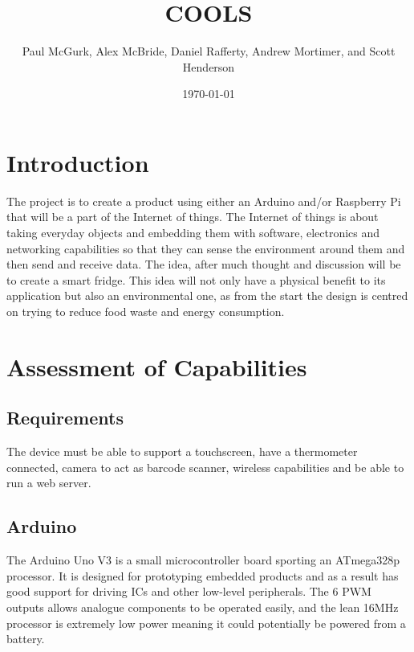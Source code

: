 \documentclass[10pt]{article}
\title{COOLS}
\author{Paul McGurk, Alex McBride, Daniel Rafferty, Andrew Mortimer, and Scott Henderson}
\date{\today}
\begin{document}
\begin{titlepage}
\maketitle
\end{titlepage}

\linespread{1.15} %
\renewcommand{\arraystretch}{1.2} %

\tableofcontents

\newpage
\section{Introduction}

The project is to create a product using either an Arduino and/or Raspberry Pi that will be a part of the Internet of things. The Internet of things is about taking everyday objects and embedding them with software, electronics and networking capabilities so that they can sense the environment around them and then send and receive data. The idea, after much thought and discussion will be to create a smart fridge. This idea will not only have a physical benefit to its application but also an environmental one, as from the start the design is centred on trying to reduce food waste and energy consumption.

\newpage
\section{Assessment of Capabilities}

\subsection{Requirements}

The device must be able to support a touchscreen, have a thermometer connected, camera to act as barcode scanner, wireless capabilities and be able to run a web server.

\subsection{Arduino}
The Arduino Uno V3 is a small microcontroller board sporting an ATmega328p processor. It is designed for prototyping embedded products and as a result has good support for driving ICs and other low-level peripherals. The 6 PWM outputs allows analogue components to be operated easily, and the lean 16MHz processor is extremely low power meaning it could potentially be powered from a battery.
\end{document}
